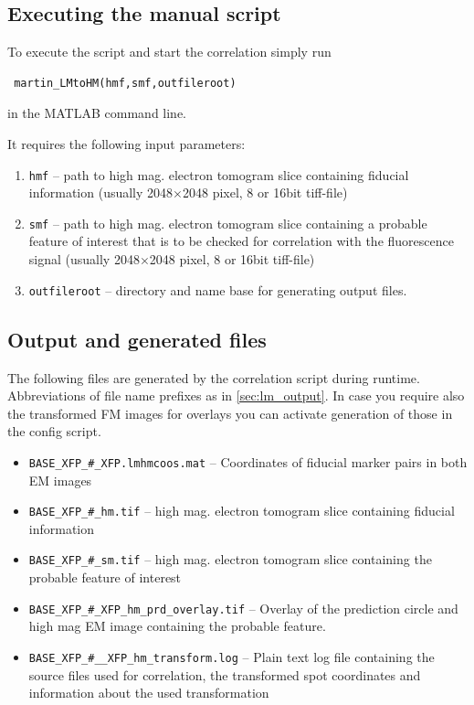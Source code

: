 \documentclass[10pt,a4paper,onepage,DIV12]{scrartcl}
\begin{document}
\subsection{Executing the manual script}
To execute the script and start the correlation simply run \begin{verbatim}
 martin_LMtoHM(hmf,smf,outfileroot)
\end{verbatim}
 in the MATLAB command line.


It requires the following input parameters:
\begin{enumerate}
 \item\texttt{hmf} -- path to high mag. electron tomogram slice containing fiducial information (usually 2048$\times$2048 pixel, 8 or 16bit tiff-file)
 \item\texttt{smf} -- path to high mag. electron tomogram slice containing a probable feature of interest that is to be checked for correlation with the fluorescence signal (usually 2048$\times$2048 pixel, 8 or 16bit tiff-file)
 \item\texttt{outfileroot} -- directory and name base for generating output files.
\end{enumerate}
\subsection{Output and generated files}
The following files are generated by the correlation script during runtime. Abbreviations of file name prefixes as in \ref{sec:lm_output}. In case you require also the transformed FM images for overlays you can activate generation of those in the config script.
\begin{itemize}
\item \texttt{BASE\_XFP\_\#\_XFP.lmhmcoos.mat} -- Coordinates of fiducial marker pairs in both EM images


\item \texttt{BASE\_XFP\_\#\_hm.tif} -- high mag. electron tomogram slice containing fiducial information 
\item \texttt{BASE\_XFP\_\#\_sm.tif} -- high mag. electron tomogram slice containing the probable feature of interest 
\item \texttt{BASE\_XFP\_\#\_XFP\_hm\_prd\_overlay.tif} -- Overlay of the prediction circle and high mag EM image containing the probable feature.


\item \texttt{BASE\_XFP\_\#\_\_XFP\_hm\_transform.log} -- Plain text log file containing the source files used for correlation, the transformed spot coordinates and information about the used transformation
\end{itemize}
\newpage
\end{document}
